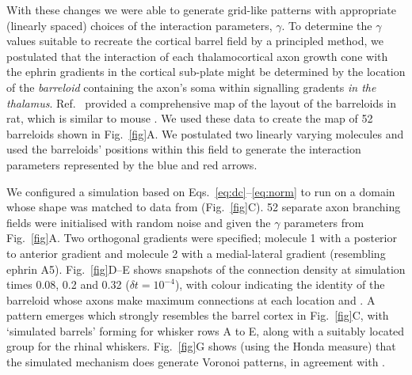 \documentclass[9pt,twocolumn,twoside,lineno]{pnas-new}
\begin{document}
With these changes we were able to generate grid-like patterns with
appropriate (linearly spaced) choices of the interaction parameters,
$\gamma$. To determine the $\gamma$ values suitable to recreate the cortical
barrel field by a principled method, we postulated that the interaction of
each thalamocortical axon growth cone with the ephrin gradients in the
cortical sub-plate might be determined by the location of the \emph{barreloid}
containing the axon's soma within signalling gradents \emph{in the
  thalamus}.
%
Ref.~\cite{haidarliu_size_2001} provided a comprehensive map of the
layout of the barreloids in rat, which is similar to mouse
\cite{van_der_loos_barreloids_1976}. We used these data to create the map of
52 barreloids shown in Fig.~\ref{fig}A. We postulated two linearly
varying molecules and used the barreloids' positions within this field to
generate the interaction parameters represented by the blue and red arrows.

We configured a simulation based on Eqs.~\ref{eq:dc}--\ref{eq:norm} to run on
a domain whose shape was matched to data from \cite{shimogori_fibroblast_2005}
(Fig.~\ref{fig}C). 52 separate axon branching fields were initialised with
random noise and given the $\gamma$ parameters from Fig.~\ref{fig}A. Two
orthogonal gradients were specified; molecule 1 with a posterior to anterior
gradient and molecule 2 with a medial-lateral gradient (resembling ephrin
A5). Fig.~\ref{fig}D--E shows snapshots of the connection density at
simulation times 0.08, 0.2 and 0.32 (${\delta}t=10^{-4}$), with colour
indicating the identity of the barreloid whose axons make maximum connections
at each location and . A pattern emerges
which strongly resembles the barrel cortex in Fig.~\ref{fig}C, with `simulated
barrels' forming for whisker rows A to E, along with a suitably located group
for the rhinal whiskers.
%
Fig.~\ref{fig}G shows (using the Honda measure) that the simulated mechanism
does generate Voronoi patterns, in agreement with
\cite{senft_mouse_1991}.

%
\end{document}
